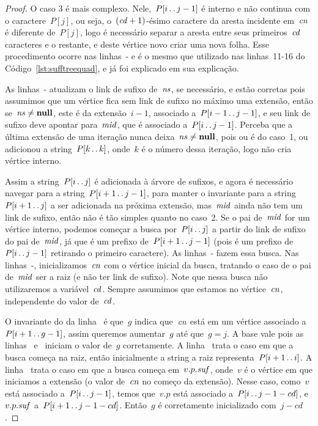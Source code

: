 \begin{proof}
O caso 3 é mais complexo. Nele,~$P[i\,.\,.\, j-1]$ é interno e não continua com o caractere~$P[j]$, ou seja, o~$(\mathit{cd} + 1)$-ésimo caractere da aresta incidente em~$\mathit{cn}$ é diferente de~$P[j]$, logo é necessário separar a aresta entre seus primeiros~$\mathit{cd}$ caracteres e o restante, e deste vértice novo criar uma nova folha. Esse procedimento ocorre nas linhas~- e é o mesmo que utilizado nas linhas~11-16 do Código~\ref{lst:sufftreequad}, e já foi explicado em sua explicação.

As linhas~- atualizam o link de sufixo de~$\mathit{ns}$, se necessário, e estão corretas pois assumimos que um vértice fica sem link de sufixo no máximo uma extensão, então se~$\mathit{ns} \neq \textbf{null}$, este é da extensão~$i-1$, associado a~$P[i-1\,.\,.\, j-1]$, e seu link de sufixo deve apontar para~$\mathit{mid}$, que é associado a~$P[i\,.\,.\, j-1]$. Perceba que a última extensão de uma iteração nunca deixa~$\mathit{ns} \neq \textbf{null}$, pois ou é do caso~1, ou adicionou a string~$P[k\,.\,.\, k]$, onde~$k$ é o número dessa iteração, logo não cria vértice interno.


Assim a string~$P[i\,.\,.\, j]$ é adicionada à árvore de sufixos, e agora é necessário navegar para a string~$P[i+1\,.\,.\, j-1]$, para manter o invariante para a string~$P[i+1\,.\,.\, j]$ a ser adicionada na próxima extensão, mas~$\mathit{mid}$ ainda não tem um link de sufixo, então não é tão simples quanto no caso~2. Se o pai de~$\mathit{mid}$ for um vértice interno, podemos começar a busca por~$P[i\,.\,.\, j]$ a partir do link de sufixo do pai de~$\mathit{mid}$, já que é um prefixo de~$P[i+1\,.\,.\, j-1]$ (pois é um prefixo de~$P[i\,.\,.\, j-1]$ retirando o primeiro caractere). As linhas~- fazem essa busca. Nas linhas~-, inicializamos~$\mathit{cn}$ com o vértice inicial da busca, tratando o caso de o pai de~$\mathit{mid}$ ser a raiz (e não ter link de sufixo). Note que nessa busca não utilizaremos a variável~$\mathit{cd}$. Sempre assumimos que estamos no vértice~$\mathit{cn}$, independente do valor de~$\mathit{cd}$.

O invariante do  da linha~ é que~$g$ indica que~$\mathit{cn}$ está em um vértice associado a~${P[i+1\,.\,.\, g-1]}$, assim queremos aumentar~$g$ até que~$g = j$. A base vale pois as linhas~ e~ iniciam o valor de~$g$ corretamente. A linha~ trata o caso em que a busca começa na raiz, então inicialmente a string a raiz representa~$P[i+1\,.\,.\, i]$. A linha~ trata o caso em que a busca começa em~$v.p.\mathit{suf}$, onde~$v$ é o vértice em que iniciamos a extensão (o valor de~$\mathit{cn}$ no começo da extensão). Nesse caso, como~$v$ está associado a~$P[i\,.\,.\, j-1]$, temos que~$v.p$ está associado a~$P[i\,.\,.\, j-1-cd]$, e~$v.p.\mathit{suf}$ a~$P[i+1\,.\,.\, j-1-cd]$. Então~$g$ é corretamente inicializado com~$j-cd$.


\end{proof}
